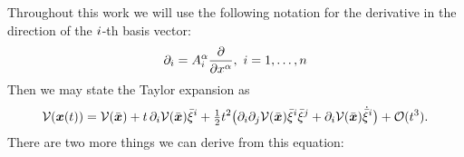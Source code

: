 Throughout this work we will use the following notation for the derivative in the direction of the $i$-th basis vector:
\begin{align}\label{eq:DefBasisDiff}
 \partial_{i} = A^{\alpha}_{i} \frac{\partial }{\partial x^{\alpha}}, \ i = 1,\ldots,n
\end{align}
Then we may state the Taylor expansion as
\begin{align}
 \mathcal{V}(\boldsymbol{x}(t)) = \mathcal{V}(\bar{\boldsymbol{x}})
  + t \, \partial_{i} \mathcal{V}(\bar{\boldsymbol{x}}) \bar{\xi}^{i}
  + \tfrac{1}{2} t^2 \big( \partial_{i} \partial_{j} \mathcal{V}(\bar{\boldsymbol{x}}) \bar{\xi}^{i} \bar{\xi}^{j} + \partial_{i} \mathcal{V}(\bar{\boldsymbol{x}}) \dot{\bar{\xi}}^{i} \big)
  + \mathcal{O}(t^3).
\label{eq:TaylorExpansionOne}
\end{align}
There are two more things we can derive from this equation:

